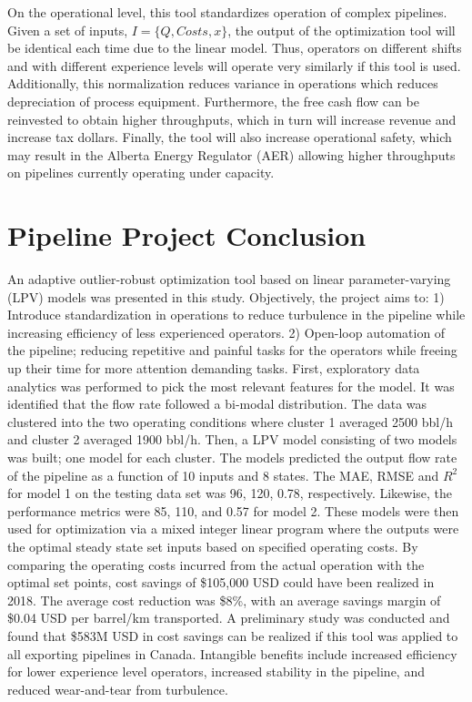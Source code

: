 On the operational level, this tool standardizes operation of complex pipelines. Given a set of inputs, $I = \{Q, Costs, x\}$, the output of the optimization tool will be identical each time due to the linear model. Thus, operators on different shifts and with different experience levels will operate very similarly if this tool is used.  Additionally, this normalization reduces variance in operations which reduces depreciation of process equipment. Furthermore, the free cash flow can be reinvested to obtain higher throughputs, which in turn will increase revenue and increase tax dollars.  Finally, the tool will also increase operational safety, which may result in the Alberta Energy Regulator (AER) allowing higher throughputs on pipelines currently operating under capacity.

\section{Pipeline Project Conclusion}
An adaptive outlier-robust optimization tool based on linear parameter-varying (LPV) models was presented in this study. Objectively, the project aims to: 1) Introduce standardization in operations to reduce turbulence in the pipeline while increasing efficiency of less experienced operators. 2) Open-loop automation of the pipeline; reducing repetitive and painful tasks for the operators while freeing up their time for more attention demanding tasks.  First, exploratory data analytics was performed to pick the most relevant features for the model. It was identified that the flow rate followed a bi-modal distribution.  The data was clustered into the two operating conditions where cluster 1 averaged 2500 bbl/h and cluster 2 averaged 1900 bbl/h.  Then, a LPV model consisting of two models was built; one model for each cluster. The models predicted the output flow rate of the pipeline as a function of 10 inputs and 8 states. The MAE, RMSE and $R^2$ for model 1 on the testing data set was 96, 120, 0.78, respectively.  Likewise, the performance metrics were 85, 110, and 0.57 for model 2.  These models were then used for optimization via a mixed integer linear program where the outputs were the optimal steady state set inputs based on specified operating costs.  By comparing the operating costs incurred from the actual operation with the optimal set points, cost savings of \$105,000 USD could have been realized in 2018.  The average cost reduction was \$8\%, with an average savings margin of \$0.04 USD per barrel/km transported.  A preliminary study was conducted and found that \$583M USD in cost savings can be realized if this tool was applied to all exporting pipelines in Canada. Intangible benefits include increased efficiency for lower experience level operators, increased stability in the pipeline, and reduced wear-and-tear from turbulence.
